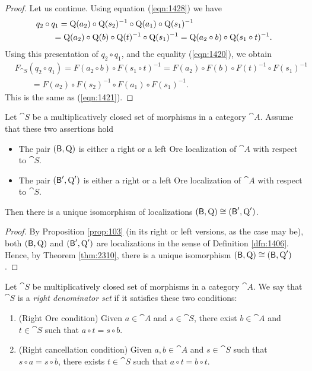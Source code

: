 \begin{proof}
Let us continue. Using equation (\ref{eqn:1428}) we have  
\[ \begin{aligned}
& q_2 \circ q_1 = \operatorname{Q}(a_2) \circ \operatorname{Q}(s_2)^{-1} \circ 
\operatorname{Q}(a_1) \circ \operatorname{Q}(s_1)^{-1} 
\\ 
& \qquad 
= \operatorname{Q}(a_2) \circ \operatorname{Q}(b) \circ \operatorname{Q}(t)^{-1} \circ \operatorname{Q}(s_1)^{-1} =
\operatorname{Q}(a_2 \circ b) \circ \operatorname{Q}(s_1 \circ t)^{-1} . 
\end{aligned} \]
Using this presentation of $q_2 \circ q_1$, and the equality (\ref{eqn:1420}), 
we obtain 
\[ \begin{aligned}
& F_{\cat{S}}(q_2 \circ q_1) = 
F(a_2 \circ b) \circ F(s_1 \circ t)^{-1} 
= F(a_2) \circ F(b) \circ F(t)^{-1} \circ F(s_1)^{-1}
\\
& \qquad 
= F(a_2) \circ F(s_2)^{-1} \circ F(a_1) \circ F(s_1)^{-1} . 
\end{aligned} \]
This is the same as (\ref{eqn:1421}). 
\end{proof}

\begin{cor} \label{cor:1405}
Let $\cat{S}$ be a multiplicatively closed set of morphisms in a category 
$\cat{A}$. Assume that these two assertions hold\tup{:}
\begin{itemize}
\item The pair $(\operatorname{\mathsf{B}}, \operatorname{Q})$ is either a right or a left Ore 
localization of $\cat{A}$ with respect to $\cat{S}$.

\item The pair $(\operatorname{\mathsf{B}}', \operatorname{Q}')$ is either a right or a left 
Ore localization of $\cat{A}$ with respect to $\cat{S}$.
\end{itemize}
Then there is a unique isomorphism of localizations 
$(\operatorname{\mathsf{B}}, \operatorname{Q}) \cong (\operatorname{\mathsf{B}}', \operatorname{Q}')$.
\end{cor}

\begin{proof}
By Proposition \ref{prop:103} (in its right or left versions, as the case may 
be), both $(\operatorname{\mathsf{B}}, \operatorname{Q})$ and $(\operatorname{\mathsf{B}}', \operatorname{Q}')$ 
are localizations in the sense of Definition \ref{dfn:1406}. Hence, by 
Theorem \ref{thm:2310}, there is a unique isomorphism 
$(\operatorname{\mathsf{B}}, \operatorname{Q}) \cong (\operatorname{\mathsf{B}}, \operatorname{Q}')$.
\end{proof}

\begin{dfn} \label{dfn:21}
Let $\cat{S}$ be multiplicatively closed set of morphisms in a  category 
$\cat{A}$. We say that $\cat{S}$ is a {\em right denominator set}
if it satisfies these two conditions:
\begin{enumerate}[leftmargin=30pt] 
\item[(RD1)] (Right Ore condition) Given $a \in \cat{A}$ and $s \in \cat{S}$,
there exist $b \in \cat{A}$ and $t \in \cat{S}$ such that
$a \circ t = s \circ b$.

\item[(RD2)] (Right cancellation condition) 
Given $a, b \in \cat{A}$ and  $s \in \cat{S}$ such that
$s \circ a = s \circ b$, there exists $t \in \cat{S}$ such that $a \circ t = b 
\circ t$.
\end{enumerate}
\end{dfn}

